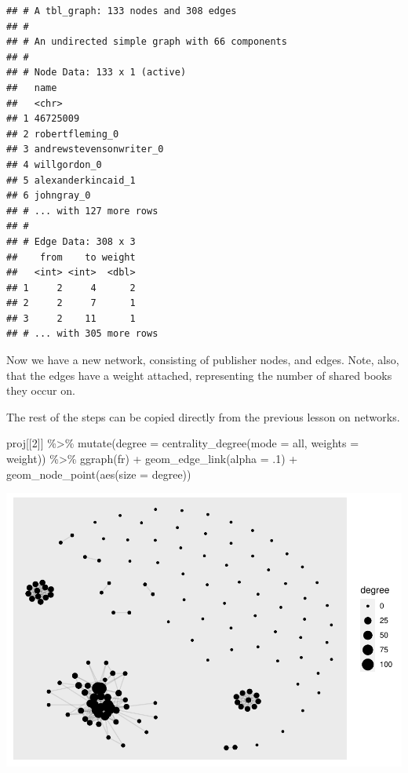\documentclass[
]{book}
\newenvironment{Shaded}{\begin{snugshade}}{\end{snugshade}}
\newcommand{\AttributeTok}[1]{\textcolor[rgb]{0.77,0.63,0.00}{#1}}
\newcommand{\DecValTok}[1]{\textcolor[rgb]{0.00,0.00,0.81}{#1}}
\newcommand{\FunctionTok}[1]{\textcolor[rgb]{0.00,0.00,0.00}{#1}}
\newcommand{\NormalTok}[1]{#1}
\newcommand{\SpecialCharTok}[1]{\textcolor[rgb]{0.00,0.00,0.00}{#1}}
\newcommand{\StringTok}[1]{\textcolor[rgb]{0.31,0.60,0.02}{#1}}
\begin{document}
\begin{verbatim}
## # A tbl_graph: 133 nodes and 308 edges
## #
## # An undirected simple graph with 66 components
## #
## # Node Data: 133 x 1 (active)
##   name                   
##   <chr>                  
## 1 46725009               
## 2 robertfleming_0        
## 3 andrewstevensonwriter_0
## 4 willgordon_0           
## 5 alexanderkincaid_1     
## 6 johngray_0             
## # ... with 127 more rows
## #
## # Edge Data: 308 x 3
##    from    to weight
##   <int> <int>  <dbl>
## 1     2     4      2
## 2     2     7      1
## 3     2    11      1
## # ... with 305 more rows
\end{verbatim}

Now we have a new network, consisting of publisher nodes, and edges. Note, also, that the edges have a weight attached, representing the number of shared books they occur on.

The rest of the steps can be copied directly from the previous lesson on networks.

\begin{Shaded}
\begin{Highlighting}[]
\NormalTok{proj[[}\DecValTok{2}\NormalTok{]] }\SpecialCharTok{\%\textgreater{}\%} 
  \FunctionTok{mutate}\NormalTok{(}\AttributeTok{degree =} \FunctionTok{centrality\_degree}\NormalTok{(}\AttributeTok{mode =} \StringTok{\textquotesingle{}all\textquotesingle{}}\NormalTok{, }\AttributeTok{weights =}\NormalTok{ weight)) }\SpecialCharTok{\%\textgreater{}\%} 
  \FunctionTok{ggraph}\NormalTok{(}\StringTok{\textquotesingle{}fr\textquotesingle{}}\NormalTok{) }\SpecialCharTok{+} 
  \FunctionTok{geom\_edge\_link}\NormalTok{(}\AttributeTok{alpha =}\NormalTok{ .}\DecValTok{1}\NormalTok{) }\SpecialCharTok{+} 
  \FunctionTok{geom\_node\_point}\NormalTok{(}\FunctionTok{aes}\NormalTok{(}\AttributeTok{size =}\NormalTok{ degree))}
\end{Highlighting}
\end{Shaded}

\includegraphics{_main_files/figure-latex/unnamed-chunk-80-1.pdf}
\end{document}
